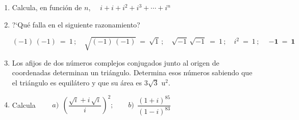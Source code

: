 \vspace{5mm}
\begin{enumerate}

\item	Calcula, en función de $n$, $\quad i+i+i^2+i^3+\cdots +i^n$ 

\vspace{-6mm}
\begin{flushright}
\begin{footnotesize} \textcolor{gris}{}	\end{footnotesize}
\end{flushright}

\item	?`Qué falla en el siguiente razonamiento?

$$ (-1)\, (-1) \ = \ 1\, ; \quad \sqrt{(-1)\, (-1)} \ = \ \sqrt{1}\, ; \quad \sqrt{-1}\, \sqrt{-1} \ = \ 1 \, ; \quad i^2 \ = \ 1 \, ; \quad \boxed{ \ \boldsymbol{-1\ = \ 1} \ }$$

\vspace{-6mm}
\begin{flushright}
\begin{footnotesize} \textcolor{gris}{}	\end{footnotesize}
\end{flushright}

\item	Los afijos de dos números complejos conjugados junto al origen de coordenadas determinan un triángulo. Determina esos números sabiendo que el triángulo es equilátero y que su área es $3\sqrt{3}$ u$^2$.

\vspace{-6mm}
\begin{flushright}
\begin{footnotesize} \textcolor{gris}{}	\end{footnotesize}
\end{flushright}

\item	Calcula $\qquad a)\ \ \left( \dfrac{\sqrt{i}+i\, \sqrt{i}}{i} \right)^2; \qquad b)\ \ \dfrac{(1+i)^{85}}{(1-i)^{83}}$


\end{enumerate}
